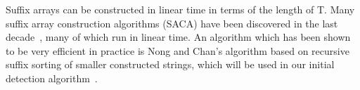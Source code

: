 \begin{table}
	\begin{center}
		\hspace{1cm}
		\hspace{1cm}
        \caption{$T=\text{BANANA\$}$}
        \label{table:BANANA}
	\end{center}
\end{table}


Suffix arrays can be constructed in linear time in terms of the length of T. Many suffix
array construction algorithms (SACA) have been discovered in the last
decade~\cite{SuffixArrayConstruction}, many of which run in linear time. An algorithm
which has been shown to be very efficient in practice is Nong and Chan's algorithm based
on recursive suffix sorting of smaller constructed strings, which will be used in our
initial detection algorithm~\cite{LinearTimeSuffixArraySAIS}. 

